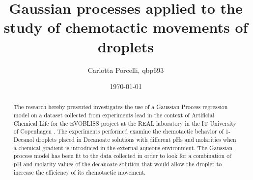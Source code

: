 \documentclass[a4paper]{article}
\title{Gaussian processes applied to the study of chemotactic movements of droplets}
\author{Carlotta Porcelli, qbp693}
\date{\today}
\begin{document}
\maketitle

\begin{abstract}
The research hereby presented investigates the use of a Gaussian Process regression model on a dataset collected from experiments lead in the context of Artificial Chemical Life for the EVOBLISS project \cite{evobliss} at the REAL laboratory in the IT University of Copenhagen \cite{itu_real} . The experiments performed examine the chemotactic behavior of 1-Decanol droplets placed in Decanoate solutions with different pHs and molarities when a chemical gradient is introduced in the external aqueous environment. The Gaussian process model has been fit to the data collected in order to look for a combination of pH and molarity values of the decanoate solution that would allow the droplet to increase the efficiency of its chemotactic movement. 
\end{abstract}
\end{document}
